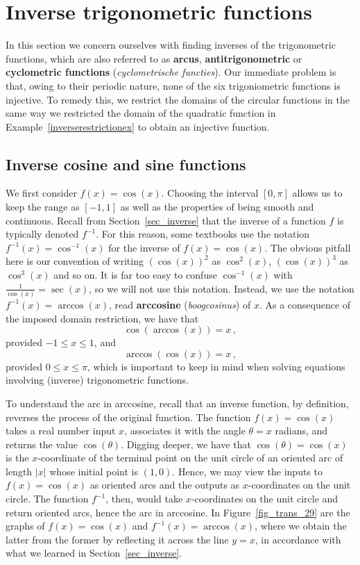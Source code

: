 \fi

\ifcourse

\section{Inverse trigonometric functions}
\label{sec_inverse_trig}
In this section we concern ourselves with finding inverses of the trigonometric functions, which are also referred to as \textbf{arcus}, \textbf{antitrigonometric} or \textbf{cyclometric functions} (\textit{cyclometrische functies}).  Our immediate problem is that, owing to their periodic nature, none of the six trigoniometric functions is  injective. To remedy this, we restrict the domains of the circular functions in the same way we restricted the domain of the quadratic function in Example~\ref{inverserestrictionex} to obtain an injective function. 

\subsection{Inverse cosine and sine functions}
We first consider $f(x) = \cos(x)$. Choosing the interval $[0,\pi]$ allows us to keep the range as $[-1,1]$ as well as the properties of being smooth and continuous. Recall from Section~\ref{sec_inverse} that the inverse of a function $f$ is typically denoted $f^{-1}$.  For this reason, some textbooks use the notation $f^{-1}(x) = \cos^{-1}(x)$ for the inverse of $f(x) = \cos(x)$.  The obvious pitfall here is our convention of writing $(\cos(x))^2$ as $\cos^{2}(x)$, $(\cos(x))^3$ as $\cos^{3}(x)$ and so on.  It is far too easy to confuse $\cos^{-1}(x)$ with  $\frac{1}{\cos(x)} = \sec(x)$, so we will not use this notation.  Instead, we use the notation $f^{-1}(x) = \arccos(x)$, read \textbf{arccosine} (\textit{boogcosinus}) of $x$.  As a consequence of the imposed domain restriction, we have that
$$\cos(\arccos(x)) = x\,,$$
provided $-1 \leq x \leq 1$, and $$\arccos(\cos(x)) = x\,,$$
provided $0 \leq x \leq \pi$, which is important to keep in mind when solving equations involving (inverse) trigonometric functions. 



To understand the arc in arccosine, recall that an inverse function, by definition, reverses the process of the original function. The function $f(x) = \cos(x)$ takes a real number input $x$, associates it with the angle $\theta = x$ radians, and returns the value $\cos(\theta)$.  Digging deeper, we have that $\cos(\theta) = \cos(x)$ is the $x$-coordinate of the terminal point on the unit circle of an oriented arc of length $|x|$ whose initial point is $(1, 0)$.  Hence, we may view the inputs to $f(x) = \cos(x)$ as oriented arcs and the outputs as $x$-coordinates on the unit circle.  The function $f^{-1}$, then, would take $x$-coordinates on the unit circle and return oriented arcs, hence the arc in arccosine. In Figure~\ref{fig_trans_29} are the graphs of $f(x) = \cos(x)$ and $f^{-1}(x) = \arccos(x)$, where we obtain the latter from the former by reflecting it across the line $y=x$, in accordance with what we learned in Section~\ref{sec_inverse}. 

